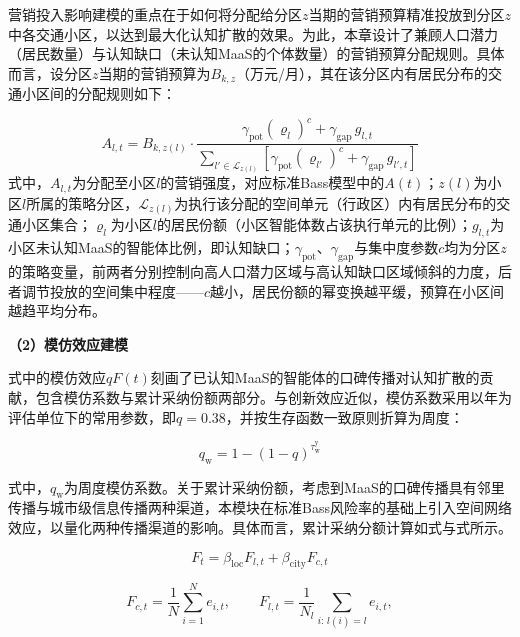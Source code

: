 营销投入影响建模的重点在于如何将分配给分区$z$当期的营销预算精准投放到分区$z$中各交通小区，以达到最大化认知扩散的效果。为此，本章设计了兼顾人口潜力（居民数量）与认知缺口（未认知MaaS的个体数量）的营销预算分配规则。具体而言，设分区$z$当期的营销预算为$B_{k,z}$（万元/月），其在该分区内有居民分布的交通小区间的分配规则如下：

\begin{equation}
A_{l,t} = B_{k,z(l)}\cdot\frac{\gamma_{\mathrm{pot}}\left(\varrho_{l}\right)^{c}+\gamma_{\mathrm{gap}}\,g_{l,t}}{\sum_{l'\in\mathcal{L}_{z(l)}}\left[\gamma_{\mathrm{pot}}\left(\varrho_{l'}\right)^{c}+\gamma_{\mathrm{gap}}\,g_{l',t}\right]}
\label{eq.opt.marketing}
\end{equation}
式中，$A_{l,t}$为分配至小区$l$的营销强度，对应标准Bass模型中的$A(t)$；$z(l)$为小区$l$所属的策略分区，$\mathcal{L}_{z(l)}$为执行该分配的空间单元（行政区）内有居民分布的交通小区集合；$\varrho_{l}$为小区$l$的居民份额（小区智能体数占该执行单元的比例）；$g_{l,t}$为小区未认知MaaS的智能体比例，即认知缺口；$\gamma_{\mathrm{pot}}$、$\gamma_{\mathrm{gap}}$与集中度参数$c$均为分区$z$的策略变量，前两者分别控制向高人口潜力区域与高认知缺口区域倾斜的力度，后者调节投放的空间集中程度——$c$越小，居民份额的幂变换越平缓，预算在小区间越趋平均分布。

\textbf{（2）模仿效应建模}

式中的模仿效应$qF(t)$刻画了已认知MaaS的智能体的口碑传播对认知扩散的贡献，包含模仿系数与累计采纳份额两部分。与创新效应近似，模仿系数采用以年为评估单位下的常用参数，即$q=0.38$\citep{sultanMetaanalysisApplicationsDiffusion1990}，并按生存函数一致原则折算为周度：

\begin{equation}
q_{\mathrm{w}} = 1-(1-q)^{\tau^{\mathrm{y}} _{\mathrm{w}}}
\label{eq.opt.bassweekly2}
\end{equation}

\noindent 式中，$q_{\mathrm{w}}$为周度模仿系数。关于累计采纳份额，考虑到MaaS的口碑传播具有邻里传播与城市级信息传播两种渠道，本模块在标准Bass风险率的基础上引入空间网络效应，以量化两种传播渠道的影响。具体而言，累计采纳分额计算如式与式所示。

\begin{equation}
F_{t}=\beta_{\mathrm{loc}}F_{l,t}+\beta_{\mathrm{city}}F_{c,t}
\label{eq.opt.bassF1}
\end{equation}

\begin{equation}
F_{c,t}=\frac{1}{N}\sum_{i=1}^{N}e_{i,t},\qquad
F_{l,t}=\frac{1}{N_l}\sum_{i:\,l(i)=l}e_{i,t},
\label{eq.opt.bassF2}
\end{equation}

